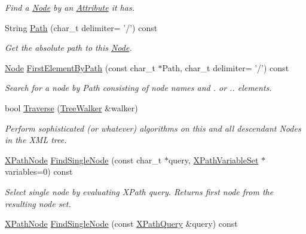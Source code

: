 \begin{DoxyCompactItemize}
\begin{DoxyCompactList}\small\item\em Find a \hyperlink{classphys_1_1xml_1_1Node}{Node} by an \hyperlink{classphys_1_1xml_1_1Attribute}{Attribute} it has. \item\end{DoxyCompactList}\item 
String \hyperlink{classphys_1_1xml_1_1Node_a0bf85dc0820ba204e7c9498c6651aec8}{Path} (char\_\-t delimiter= '/') const 
\begin{DoxyCompactList}\small\item\em Get the absolute path to this \hyperlink{classphys_1_1xml_1_1Node}{Node}. \item\end{DoxyCompactList}\item 
\hyperlink{classphys_1_1xml_1_1Node}{Node} \hyperlink{classphys_1_1xml_1_1Node_af2a9ac5c4e3252dca0e17720de093a9a}{FirstElementByPath} (const char\_\-t $\ast$Path, char\_\-t delimiter= '/') const 
\begin{DoxyCompactList}\small\item\em Search for a node by Path consisting of node names and . or .. elements. \item\end{DoxyCompactList}\item 
bool \hyperlink{classphys_1_1xml_1_1Node_a0029d08d3689c36d882ada0c0c9cf6e9}{Traverse} (\hyperlink{classphys_1_1xml_1_1TreeWalker}{TreeWalker} \&walker)
\begin{DoxyCompactList}\small\item\em Perform sophisticated (or whatever) algorithms on this and all descendant Nodes in the XML tree. \item\end{DoxyCompactList}\item 
\hyperlink{classphys_1_1xml_1_1XPathNode}{XPathNode} \hyperlink{classphys_1_1xml_1_1Node_a11966aa8afdfa586404393ebae9b07f5}{FindSingleNode} (const char\_\-t $\ast$query, \hyperlink{classphys_1_1xml_1_1XPathVariableSet}{XPathVariableSet} $\ast$variables=0) const 
\begin{DoxyCompactList}\small\item\em Select single node by evaluating XPath query. Returns first node from the resulting node set. \item\end{DoxyCompactList}\item 
\hyperlink{classphys_1_1xml_1_1XPathNode}{XPathNode} \hyperlink{classphys_1_1xml_1_1Node_a13b958f663f9605061e5e47dfd8e1966}{FindSingleNode} (const \hyperlink{classphys_1_1xml_1_1XPathQuery}{XPathQuery} \&query) const 

\end{DoxyCompactItemize}

